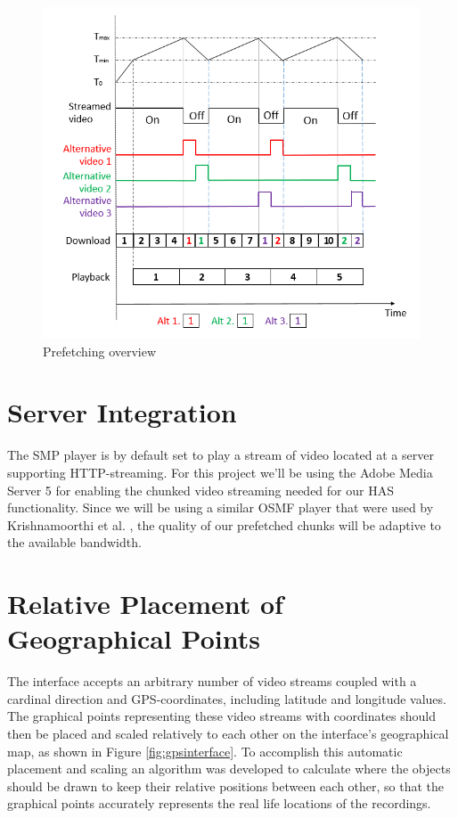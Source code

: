 \begin{figure}[t!]
\begin{center}
	\includegraphics[scale=0.6]{prefetch.png}
	\caption{Prefetching overview}
	\label{fig:prefetch}
\end{center}
\end{figure}

\section{Server Integration}
\label{sec:serverintegration}

The SMP player is by default set to play a stream of video located at a server supporting HTTP-streaming. For this project we'll be using the Adobe Media Server 5 for enabling the chunked video streaming needed for our HAS functionality. Since we will be using a similar OSMF player that were used by Krishnamoorthi et al. \cite{hasmultipath}, the quality of our prefetched chunks will be adaptive to the available bandwidth\cite{hasmultipath}.

\section{Relative Placement of Geographical Points}
\label{sec:relativeplacement}

The interface accepts an arbitrary number of video streams coupled with a cardinal direction and GPS-coordinates, including latitude and longitude values. The graphical points representing these video streams with coordinates should then be placed and scaled relatively to each other on the interface's geographical map, as shown in Figure \ref{fig:gpsinterface}. To accomplish this automatic placement and scaling an algorithm was developed to calculate where the objects should be drawn to keep their relative positions between each other, so that the graphical points accurately represents the real life locations of the recordings.

